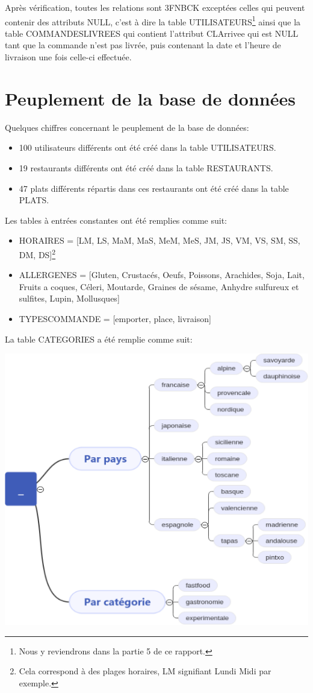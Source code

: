 \documentclass[10pt, a4paper]{article}
\begin{document}
Après vérification, toutes les relations sont 3FNBCK exceptées celles qui peuvent contenir des attributs NULL, c'est à dire la table UTILISATEURS\footnote[2]{Nous y reviendrons dans la partie 5 de ce rapport.} ainsi que la table COMMANDESLIVREES qui contient l'attribut CLArrivee qui est NULL tant que la commande n'est pas livrée, puis contenant la date et l'heure de livraison une fois celle-ci effectuée.

\section{Peuplement de la base de données}

Quelques chiffres concernant le peuplement de la base de données:

\begin{itemize}
    \item 100 utilisateurs différents ont été créé dans la table UTILISATEURS.
    \item 19 restaurants différents ont été créé dans la table RESTAURANTS.
    \item 47 plats différents répartis dans ces restaurants ont été créé dans la table PLATS.
\end{itemize}
Les tables à entrées constantes ont été remplies comme suit:
\begin{itemize}
    \item HORAIRES = [LM, LS, MaM, MaS, MeM, MeS, JM, JS, VM, VS, SM, SS, DM, DS]\footnote[3]{Cela correspond à des plages horaires, LM signifiant Lundi Midi par exemple.}
    \item ALLERGENES = [Gluten, Crustacés, Oeufs, Poissons, Arachides, Soja, Lait, Fruits a coques, Céleri, Moutarde, Graines de sésame, Anhydre sulfureux et sulfites, Lupin, Mollusques]
    \item TYPESCOMMANDE = [emporter, place, livraison]
\end{itemize}
\newpage 
La table CATEGORIES a été remplie comme suit:
\begin{center}
    \includegraphics[scale=2.5]{categories.png}
\end{center}
\end{document}
